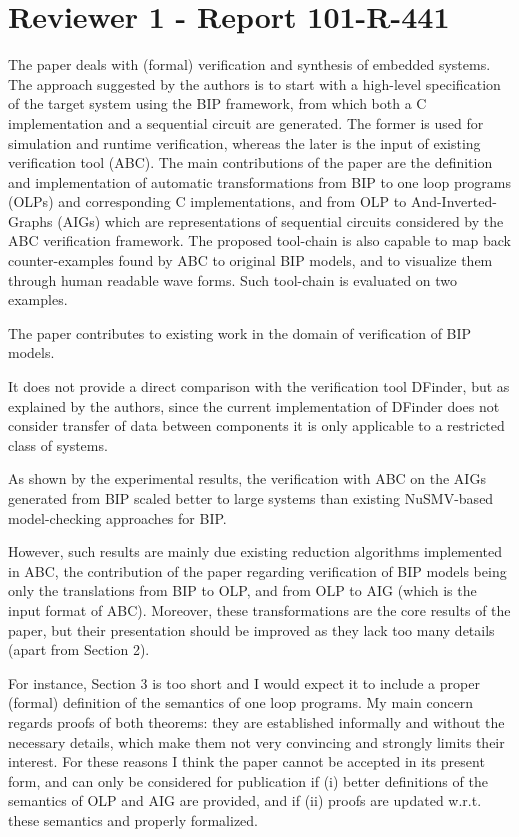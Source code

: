 \section{Reviewer 1 - Report 101-R-441}
The paper deals with (formal) verification and synthesis of embedded systems.
The approach suggested by the authors is to start with a high-level 
specification of the target system using the BIP framework, from which both a 
C implementation and a sequential circuit are generated.
The former is used for simulation and runtime verification, whereas the later 
is the input of existing verification tool (ABC).
The main contributions of the paper are the definition and implementation of 
automatic transformations from BIP to one loop programs (OLPs) and 
corresponding C implementations, and from OLP to And-Inverted-Graphs (AIGs) 
which are representations of sequential circuits considered by the ABC 
verification framework.
The proposed tool-chain is also capable to map back counter-examples found by 
ABC to original BIP models, and to visualize them through human readable wave 
forms.
Such tool-chain is evaluated on two examples.

The paper contributes to existing work in the domain of verification of BIP 
models.

It does not provide a direct comparison with the verification tool DFinder, 
but as explained by the authors, since the current implementation of DFinder 
does not consider transfer of data between components it is only applicable 
to a restricted class of systems.



As shown by the experimental results, the verification with ABC on the AIGs 
generated from BIP scaled better to large systems than existing NuSMV-based 
model-checking approaches for BIP.

However, such results are mainly due existing reduction algorithms 
implemented in ABC, the contribution of the paper regarding verification of 
BIP models being only the translations from BIP to OLP, and from OLP to AIG 
(which is the input format of ABC).
Moreover, these transformations are the core results of the paper, but their 
presentation should be improved as they lack too many details (apart from 
Section 2).


For instance, Section 3 is too short and I would expect it to include a 
proper (formal) definition of the semantics of one loop programs.
My main concern regards proofs of both theorems: they are established 
informally and without the necessary details, which make them not very 
convincing and strongly limits their interest.
For these reasons I think the paper cannot be accepted in its present form, 
and can only be considered for publication if (i) better definitions of the 
semantics of OLP and AIG are provided, and if (ii) proofs are updated w.r.t. 
these semantics and properly formalized.

